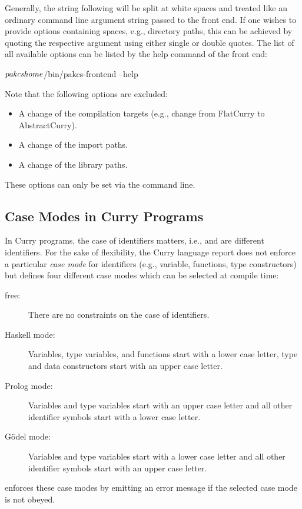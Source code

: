 Generally, the string following 
will be split at white spaces and treated like an ordinary
command line argument string passed to the front end.
If one wishes to provide options containing spaces, e.g., directory paths,
this can be achieved by quoting the respective argument
using either single or double quotes.
The list of all available options can be listed by the help command
of the front end:
\begin{curry}
$\mbox{\textit{pakcshome}}$/bin/pakcs-frontend --help
\end{curry}
%
Note that the following options are excluded:
\begin{itemize}
\item A change of the compilation targets
      (e.g., change from FlatCurry to AbstractCurry).
\item A change of the import  paths.
\item A change of the library paths.
\end{itemize}
%
These options can only be set via the command line.


\subsection{Case Modes in Curry Programs}

In Curry programs, the case of identifiers matters,
i.e.,  and  are different identifiers.
For the sake of flexibility, the Curry language report
does not enforce a particular \emph{case mode}
for identifiers (e.g., variable, functions, type constructors)
but defines four different case modes which can be
selected at compile time:
%
\begin{description}
\item[free:]
There are no constraints on the case of identifiers.
\item[Haskell mode:]
Variables, type variables, and functions start with a lower case letter,
type and data constructors start with an upper case letter.
\item[Prolog mode:]
Variables and type variables start with an upper case letter and
all other identifier symbols start with a lower case letter.
\item[G\"odel mode:]
Variables and type variables start with a lower case letter and
all other identifier symbols start with an upper case letter.
\end{description}
%
\CYS enforces these case modes by emitting an error message
if the selected case mode is not obeyed.


